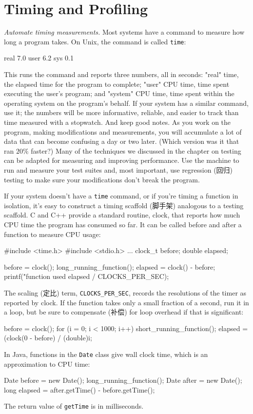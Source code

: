 \section{Timing and Profiling}
\emph{Automate timing measurements.} Most systems have a command to measure
how long a program takes. On Unix, the command is called \verb'time':
\begin{wellcode}
    real    7.0
    user    6.2
    sys     0.1
\end{wellcode}
This runs the command and reports three numbers, all in seconds: "real"
time, the elapsed time for the program to complete; "user" CPU time, time
spent executing the user's program; and "system" CPU time, time spent
within the operating system on the program's behalf. If your system has a
similar command, use it; the numbers will be more informative, reliable,
and easier to track than time measured with a stopwatch. And keep good
notes. As you work on the program, making modifications and measurements,
you will accumulate a lot of data that can become confusing a day or two
later. (Which version was it that ran $20\%$ faster?) Many of the
techniques we discussed in the chapter on testing can be adapted for
measuring and improving performance. Use the machine to run and measure
your test suites and, most important, use regression (回归) testing to make
sure your modifications don't break the program.

If your system doesn't have a \verb'time' command, or if you're timing a
function in isolation, it's easy to construct a timing scaffold (脚手架)
analogous to a testing scaffold. C and C++ provide a standard routine,
clock, that reports how much CPU time the program has consumed so far. It
can be called before and after a function to measure CPU usage:
\begin{wellcode}
    #include <time.h>
    #include <stdio.h>
        ...
        clock_t before;
        double  elapsed;

        before = clock();
        long_running_function();
        elapsed = clock() - before;
        printf("function used %
                elapsed / CLOCKS_PER_SEC);
\end{wellcode}
The scaling (定比) term, \verb'CLOCKS_PER_SEC', records the resolutions of the
timer as reported by clock. If the function takes only a small fraction of
a second, run it in a loop, but be sure to compensate (补偿) for loop
overhead if that is significant:
\begin{wellcode}
    before = clock();
    for (i = 0; i < 1000; i++)
        short_running_function();
    elapsed = (clock(0 - before) / (double)i;
\end{wellcode}
In Java, functions in the \verb'Date' class give wall clock time, which is
an approximation to CPU time:
\begin{wellcode}
    Date before = new Date();
    long_running_function();
    Date after = new Date();
    long elapsed = after.getTime() - before.getTime();
\end{wellcode}
The return value of \verb'getTime' is in milliseconds.
